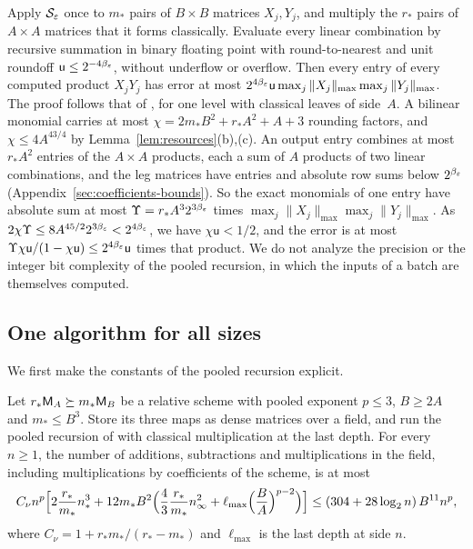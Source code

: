 \begin{remark}\label{rem:precision}
Apply \(\mathcal S_\varepsilon\) once to \(m_*\) pairs of \(B\times B\)
matrices \(X_j,Y_j\), and multiply the \(r_*\) pairs of \(A\times A\)
matrices that it forms classically. Evaluate every linear combination by
recursive summation in binary floating point with round-to-nearest and
unit roundoff \(\mathsf u\le2^{-4\beta_\varepsilon}\), without underflow or
overflow. Then every entry of every computed product \(X_jY_j\) has error
at most \(2^{4\beta_\varepsilon}\mathsf u\max_j\|X_j\|_{\max}\max_j\|Y_j\|_{\max}\).
The proof follows that of \citep[Proposition~9.6]{FinCon26}, for one
level with classical leaves of side~\(A\). A bilinear monomial carries at
most \(\chi=2m_*B^2+r_*A^2+A+3\) rounding factors, and
\(\chi\le4A^{43/4}\) by Lemma~\ref{lem:resources}(b),(c). An output entry
combines at most \(r_*A^2\) entries of the \(A\times A\) products, each
a sum of \(A\) products of two linear combinations, and the leg matrices
have entries and absolute row sums below \(2^{\beta_\varepsilon}\)
(Appendix~\ref{sec:coefficients-bounds}). So the exact monomials of one
entry have absolute sum at most \(\Upsilon=r_*A^32^{3\beta_\varepsilon}\) times
\(\max_j\|X_j\|_{\max}\max_j\|Y_j\|_{\max}\). As
\(2\chi\Upsilon\le8A^{45/2}2^{3\beta_\varepsilon}<2^{4\beta_\varepsilon}\), we have
\(\chi\mathsf u<1/2\), and the error is
at most \(\Upsilon\chi\mathsf u/(1-\chi\mathsf u)\le2^{4\beta_\varepsilon}\mathsf u\)
times that product. We do not analyze the precision or the integer bit
complexity of the pooled recursion, in which the inputs of a batch are
themselves computed.
\end{remark}

\subsection{One algorithm for all sizes}
\label{sec:seeds-uniform}

We first make the constants of the pooled recursion explicit.

\begin{lemma}
\label{lem:pooled-constants}
Let \(r_*\mathsf M_A\succeq m_*\mathsf M_B\) be a relative scheme with pooled exponent
\(p\le3\), \(B\ge2A\) and \(m_*\le B^3\). Store its three maps as dense
matrices over a field, and run the pooled recursion of
\citep[Lemma~2.4]{FinCon26} with classical multiplication at the last
depth. For every \(n\ge1\), the number of additions, subtractions and
multiplications in the field, including multiplications by coefficients
of the scheme, is at most
\[
 C_\nu n^p\Bigl[2\frac{r_*}{m_*}n_*^3+12m_*B^2\Bigl(\frac43\frac{r_*}{m_*}
 n_\infty^2+\ell_{\max}\Bigl(\frac BA\Bigr)^{p-2}\Bigr)\Bigr]
 \le(304+28\log_2n)\,B^{11}n^p,
\]
where \(C_\nu=1+r_*m_*/(r_*-m_*)\) and \(\ell_{\max}\) is the last depth at
side \(n\).
\end{lemma}


